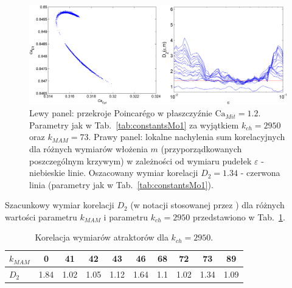 \begin{figure}[!ht]
	\centering
	\includegraphics[width=1\textwidth]{rysunki/rozdzial_5/kmam73_all}
	\caption[Przekroje Poincar\'ego w Modelu \#1]{Lewy panel: przekroje Poincar\'ego  w płaszczyźnie $\textrm{Ca}_{Mit}=1.2$. Parametry jak w Tab.~\ref{tab:constantsMo1} za wyjątkiem $k_{ch}=2950$ oraz $k_{MAM} = 73$. Prawy panel: lokalne nachylenia sum korelacyjnych dla różnych wymiarów włożenia $m$ (przyporządkowanych poszczególnym krzywym) w zależności od   wymiaru pudełek $\varepsilon$ - niebieskie linie. Oszacowany wymiar korelacji $D_2=1.34$ - czerwona linia (parametry jak w Tab.~\ref{tab:constantsMo1}).}
	\label{fig:returnmap}
\end{figure}

\bigskip

Szacunkowy wymiar korelacji $D_2$ (w notacji stosowanej przez \cite{Hegger1999}) dla różnych wartości parametru $k_{MAM} $ i parametru $k_{ch} = 2950$ przedstawiono w Tab.~\ref{tab:dimensions}.

\bigskip

\begin{table}[!h]
	\centering
	\begin{tabular}{|l|c|c|c|c|c|c|c|c|c|} \hline
		\rule{0pt}{4ex}$k_{MAM}$	&0	&	41		&	42		&	43		&  46	& 68	& 72	& 73	& 89	\\[1.8ex] \hline
		\rule{0pt}{4ex}$D_2$		 & 1.84	&1.02	&	1.05	&	1.12	& 1.64	& 1.1	& 1.02	& 1.34	& 1.09	\\[2ex] \hline
	\end{tabular}
	\caption [Korelacja wymiaru atraktorów]{Korelacja wymiarów atraktorów dla $k_{ch} = 2950$.} 
	\label{tab:dimensions}
\end{table} 

